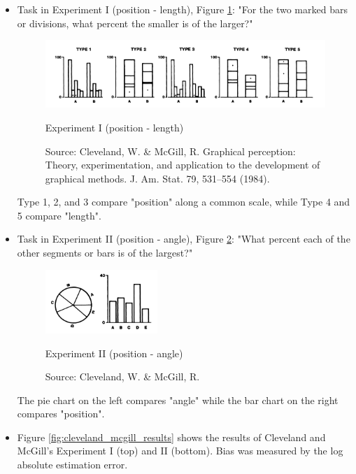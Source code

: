 \begin{itemize}
	\item Task in Experiment I (position - length), Figure \ref{fig:cleveland_mcgill_1}: "For the two marked bars or divisions, what percent the smaller is of the larger?"
	\begin{figure}[ht]
		\begin{center}
			\includegraphics[width=\textwidth]{figures/cleveland_mcgill_1.png}
			\caption{
				Experiment I (position - length)}
			\caption*{Source:  Cleveland, W. \& McGill, R. Graphical perception: Theory, experimentation, and application to the development of graphical methods. J. Am. Stat. 79, 531–554 (1984).}
			\label{fig:cleveland_mcgill_1}
		\end{center}
	\end{figure} \newline
	Type 1, 2, and 3 compare "position" along a common scale, while Type 4 and 5 compare "length". 
	\item Task in Experiment II (position - angle), Figure \ref{fig:cleveland_mcgill_2}: "What percent each of the other segments or bars is of the largest?"
	\begin{figure}[ht]
		\begin{center}
			\includegraphics[width=0.4\textwidth]{figures/cleveland_mcgill_2.png}
			\caption{
				Experiment II (position - angle)}
			\caption*{Source: Cleveland, W. \& McGill, R.}
			\label{fig:cleveland_mcgill_2}
		\end{center}
	\end{figure} \newline
	The pie chart on the left compares "angle" while the bar chart on the right compares "position".
	\item Figure \ref{fig:cleveland_mcgill_results} shows the results of Cleveland and McGill's Experiment I (top) and II (bottom). Bias was measured by the log absolute estimation error.

\end{itemize}
